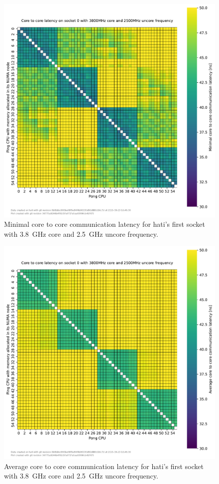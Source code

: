 \begin{figure}[]
    \centering
    \includegraphics[width=\columnwidth]{fig/core-to-core-latency/core-to-core-heatmap-min-3800-2500.pdf}
    \caption{Minimal core to core communication latency for hati's first socket with \SI{3.8}{\GHz} core and \SI{2.5}{\GHz} uncore frequency.}
\end{figure}
\begin{figure}[]
    \centering
    \includegraphics[width=\columnwidth]{fig/core-to-core-latency/core-to-core-heatmap-avg-3800-2500.pdf}
    \caption{Average core to core communication latency for hati's first socket with \SI{3.8}{\GHz} core and \SI{2.5}{\GHz} uncore frequency.}
\end{figure}
